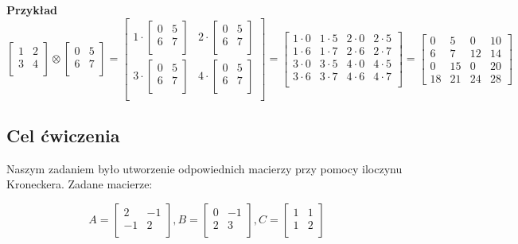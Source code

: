 		\textbf{Przykład}
	$$\begin{bmatrix}1&2\\3&4\\\end{bmatrix}\otimes {\begin{bmatrix}0&5\\6&7\\\end{bmatrix}}={\begin{bmatrix}1\cdot {\begin{bmatrix}0&5\\6&7\\\end{bmatrix}}&2\cdot {\begin{bmatrix}0&5\\6&7\\\end{bmatrix}}\\3\cdot {\begin{bmatrix}0&5\\6&7\\\end{bmatrix}}&4\cdot {\begin{bmatrix}0&5\\6&7\\\end{bmatrix}}\\\end{bmatrix}}={\begin{bmatrix}1\cdot 0&1\cdot 5&2\cdot 0&2\cdot 5\\1\cdot 6&1\cdot 7&2\cdot 6&2\cdot 7\\3\cdot 0&3\cdot 5&4\cdot 0&4\cdot 5\\3\cdot 6&3\cdot 7&4\cdot 6&4\cdot 7\\\end{bmatrix}}={\begin{bmatrix}0&5&0&10\\6&7&12&14\\0&15&0&20\\18&21&24&28\end{bmatrix}}$$
	
	\subsection{Cel ćwiczenia}
	Naszym zadaniem było utworzenie odpowiednich macierzy przy pomocy iloczynu Kroneckera. Zadane macierze: 
	
		$$A = \begin{bmatrix}2&-1\\-1&2\\\end{bmatrix},  B = \begin{bmatrix}0&-1\\2&3\\\end{bmatrix},  C = \begin{bmatrix}1&1\\1&2\\\end{bmatrix} $$
	
